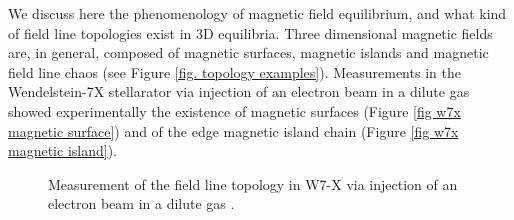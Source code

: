 \documentclass[my_thesis.tex]{subfiles}
\begin{document}
We discuss here the phenomenology of magnetic field equilibrium, and what kind of field line topologies exist in 3D equilibria. Three dimensional magnetic fields are, in general, composed of  magnetic surfaces, magnetic islands and magnetic field line chaos (see Figure \ref{fig. topology examples}). Measurements in the Wendelstein-7X stellarator via injection of an electron beam in a dilute gas \citep{pedersenConfirmationTopologyWendelstein2016} showed experimentally the existence of magnetic surfaces (Figure \ref{fig w7x magnetic surface}) and of the edge magnetic island chain (Figure \ref{fig w7x magnetic island}).

\begin{figure}%
	\centering
	\qquad
	\caption{Measurement of the field line topology in W7-X via injection of an electron beam in a dilute gas \citep{pedersenConfirmationTopologyWendelstein2016}.}
	\label{fig. w7x topology measurement}%
\end{figure}
\end{document}
